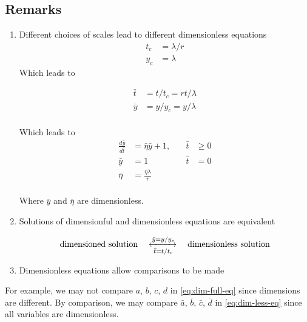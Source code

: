 \documentclass[12pt,twoside]{article}
\begin{document}
\subsection{Remarks}
\begin{enumerate}
\item Different choices of scales lead to different dimensionless equations
  \begin{equation}
    \begin{aligned}
      t_c &= \lambda/r \\
      y_c &= \lambda
    \end{aligned}
  \end{equation}
  Which leads to

  \begin{equation}
    \begin{aligned}
      \bar{t} &= t/t_c = rt/\lambda \\
      \bar{y} &= y/y_c = y/\lambda \\
    \end{aligned}
  \end{equation}


  Which leads to
  \begin{equation}
    \begin{aligned}
      \frac{d\bar{y}}{d\bar{t}} &= \bar{\eta}\bar{y} + 1, &\quad \bar{t}&\ge0 \\
      \bar{y} &= 1 &\quad \bar{t} &= 0 \\
      \bar{\eta} &= \frac{\eta\lambda}{r} \\
    \end{aligned}
  \end{equation}

  Where $\bar{y}$ and $\bar{\eta}$ are dimensionless.

\item Solutions of dimensionful and dimensionless equations are equivalent

  \begin{equation}
    \text{dimensioned solution}\quad\xleftrightarrow[\bar{t} = t/t_c]{\bar{y} = y/y_c}\quad
    \text{dimensionless solution}
  \end{equation}

\item Dimensionless equations allow comparisons to be made
\end{enumerate}

For example, we may not compare $a$, $b$, $c$, $d$ in \cref{eq:dim-full-eq}
since dimensions are different. By comparison, we may compare $\bar{a}$,
$\bar{b}$, $\bar{c}$, $\bar{d}$ in \cref{eq:dim-less-eq} since all variables are
dimensionless.
\end{document}
